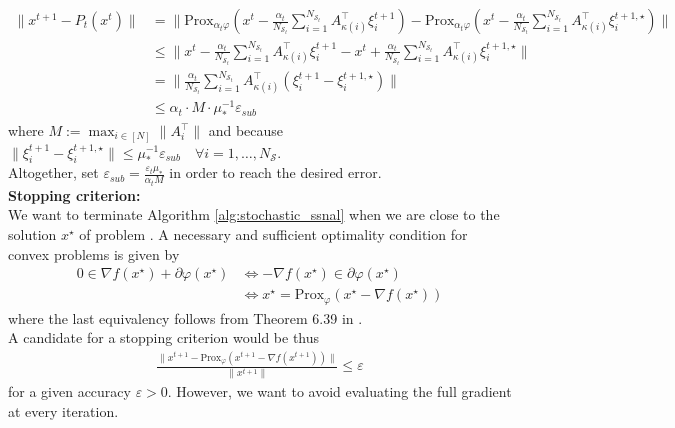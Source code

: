 \documentclass[12pt,a4paper,twoside]{article}
\makeatletter
\renewcommand*{\eqref}[1]{%
	\hyperref[{#1}]{\textup{\tagform@{\ref*{#1}}}}%
}
\theoremstyle{plain}
\theoremstyle{note}
\numberwithin{thm}{section}
\newcommand{\trp}[1]{#1^{\intercal}}
\newcommand{\prox}[2]{\text{Prox}_{#1}\left(#2\right)}
\newcommand{\ixmap}[1]{{\kappa(#1)}}
\let\temp\phi
\let\phi\varphi
\let\varphi\temp
\let\epsilon\varepsilon
\makeatother
\begin{document}
	\begin{align*}
		\Bigg\|x^{t+1} - P_t(x^t)\Bigg\| &= \Bigg\|\prox{\alpha_t \phi}{x^t - \frac{\alpha_t}{N_{\mathcal{S}_t}} \sum_{i =1}^{N_{\mathcal{S}_t}} A_\ixmap{i}^\intercal \xi_i^{t+1}} - \prox{\alpha_t \phi}{x^t - \frac{\alpha_t}{N_{\mathcal{S}_t}} \sum_{i =1}^{N_{\mathcal{S}_t}} A_\ixmap{i}^\intercal \xi_i^{t+1, \star}} \Bigg\| \\
		&\leq \Bigg\| x^t - \frac{\alpha_t}{N_{\mathcal{S}_t}} \sum_{i =1}^{N_{\mathcal{S}_t}} A_\ixmap{i}^\intercal\xi_i^{t+1} - x^t +  \frac{\alpha_t}{N_{\mathcal{S}_t}} \sum_{i =1}^{N_{\mathcal{S}_t}} A_\ixmap{i}^\intercal \xi_i^{t+1, \star} \Bigg\| \\
		&= \Bigg\| \frac{\alpha_t}{N_{\mathcal{S}_t}} \sum_{i =1}^{N_{\mathcal{S}_t}} A_\ixmap{i}^\intercal (\xi_i^{t+1} - \xi_i^{t+1, \star})\Bigg\| \\
		&\leq \alpha_t \cdot M \cdot\mu_\ast^{-1} \epsilon_{sub} 
	\end{align*}
	where $M:= \max_{i \in [N]} \|\trp{A}_i\|$ and because $\|\xi_i^{t+1} - \xi_i^{t+1, \star}\| \leq \mu_\ast^{-1} \epsilon_{sub} \quad \forall i = 1,\dots, N_\mathcal{S}$.\\
	Altogether, set $\epsilon_{sub} = \frac{\epsilon_t \mu_\ast}{\alpha_t M}$ in order to reach the desired error.\\
	
	\textbf{Stopping criterion:}\\
	We want to terminate Algorithm \ref{alg:stochastic_ssnal} when we are close to the solution $x^\star$ of problem \eqref{prob:deterministic}. A necessary and sufficient optimality condition for convex problems is given by
	\begin{align*}
		0 \in \nabla f(x^\star) + \partial \phi(x^\star) &\Longleftrightarrow -\nabla f(x^\star) \in \partial \phi(x^\star) \\
		&\Longleftrightarrow x^\star = \prox{\phi}{x^\star - \nabla f(x^\star) }
	\end{align*}
	where the last equivalency follows from Theorem 6.39 in \cite{Beck2017}.\\
	
	A candidate for a stopping criterion would be thus 
	\begin{align*}
		\frac{\|  x^{t+1} - \prox{\phi}{x^{t+1} - \nabla f(x^{t+1}) } \|}{\|x^{t+1}\|} \leq \epsilon
	\end{align*}
	for a given accuracy $\epsilon > 0$. However, we want to avoid evaluating the full gradient at every iteration. 
	
\end{document}
